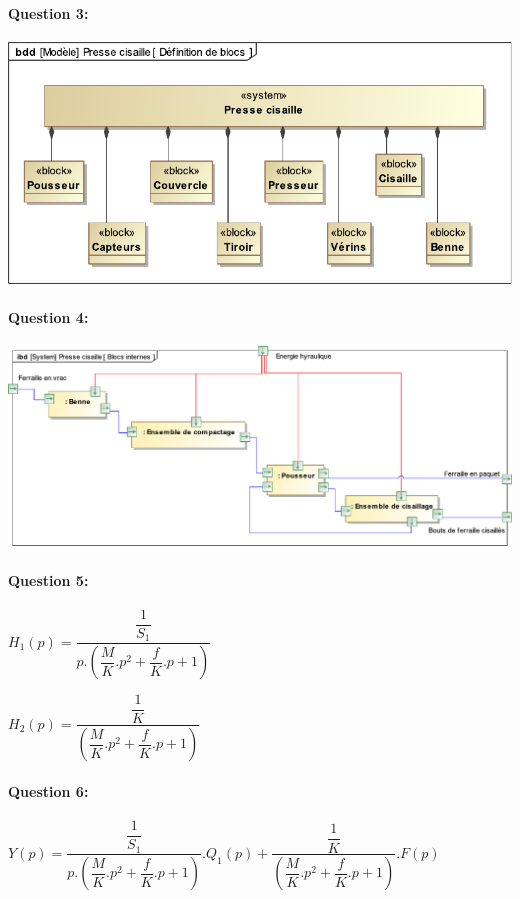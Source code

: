 \paragraph{Question 3:}

\begin{center}
 \includegraphics[width=0.8\linewidth]{img/BDD_corrige}
\end{center}

\paragraph{Question 4:}

\begin{center}
 \includegraphics[width=0.8\linewidth]{img/Blocs_internes_corrige}
\end{center}

\paragraph{Question 5:}

$H_1(p)=\dfrac{\dfrac{1}{S_1}}{p.\left(\dfrac{M}{K}.p^2+\dfrac{f}{K}.p+1\right)}$

$H_2(p)=\dfrac{\dfrac{1}{K}}{\left(\dfrac{M}{K}.p^2+\dfrac{f}{K}.p+1\right)}$

\paragraph{Question 6:}

$Y(p)=\dfrac{\dfrac{1}{S_1}}{p.\left(\dfrac{M}{K}.p^2+\dfrac{f}{K}.p+1\right)}.Q_1(p)+\dfrac{\dfrac{1}{K}}{\left(\dfrac{M}{K}.p^2+\dfrac{f}{K}.p+1\right)}.F(p)$

